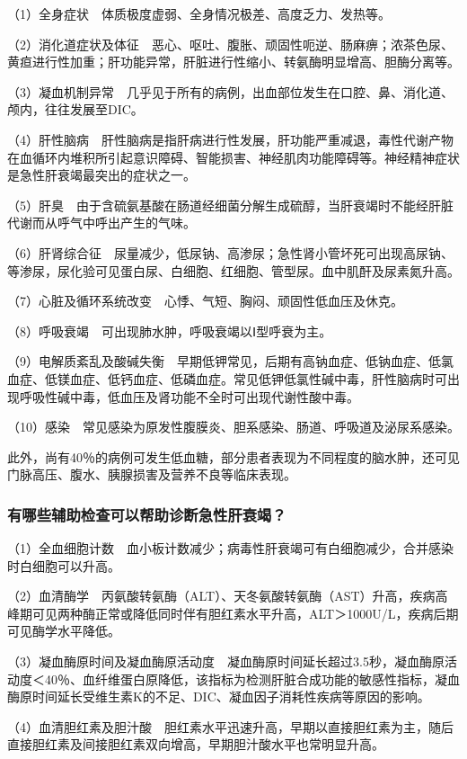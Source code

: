（1）全身症状　体质极度虚弱、全身情况极差、高度乏力、发热等。

（2）消化道症状及体征　恶心、呕吐、腹胀、顽固性呃逆、肠麻痹；浓茶色尿、黄疸进行性加重；肝功能异常，肝脏进行性缩小、转氨酶明显增高、胆酶分离等。

（3）凝血机制异常　几乎见于所有的病例，出血部位发生在口腔、鼻、消化道、颅内，往往发展至DIC。

（4）肝性脑病　肝性脑病是指肝病进行性发展，肝功能严重减退，毒性代谢产物在血循环内堆积所引起意识障碍、智能损害、神经肌肉功能障碍等。神经精神症状是急性肝衰竭最突出的症状之一。

（5）肝臭　由于含硫氨基酸在肠道经细菌分解生成硫醇，当肝衰竭时不能经肝脏代谢而从呼气中呼出产生的气味。

（6）肝肾综合征　尿量减少，低尿钠、高渗尿；急性肾小管坏死可出现高尿钠、等渗尿，尿化验可见蛋白尿、白细胞、红细胞、管型尿。血中肌酐及尿素氮升高。

（7）心脏及循环系统改变　心悸、气短、胸闷、顽固性低血压及休克。

（8）呼吸衰竭　可出现肺水肿，呼吸衰竭以Ⅰ型呼衰为主。

（9）电解质紊乱及酸碱失衡　早期低钾常见，后期有高钠血症、低钠血症、低氯血症、低镁血症、低钙血症、低磷血症。常见低钾低氯性碱中毒，肝性脑病时可出现呼吸性碱中毒，低血压及肾功能不全时可出现代谢性酸中毒。

（10）感染　常见感染为原发性腹膜炎、胆系感染、肠道、呼吸道及泌尿系感染。

此外，尚有40％的病例可发生低血糖，部分患者表现为不同程度的脑水肿，还可见门脉高压、腹水、胰腺损害及营养不良等临床表现。

\subsubsection{有哪些辅助检查可以帮助诊断急性肝衰竭？}

（1）全血细胞计数　血小板计数减少；病毒性肝衰竭可有白细胞减少，合并感染时白细胞可以升高。

（2）血清酶学　丙氨酸转氨酶（ALT）、天冬氨酸转氨酶（AST）升高，疾病高峰期可见两种酶正常或降低同时伴有胆红素水平升高，ALT＞1000U/L，疾病后期可见酶学水平降低。

（3）凝血酶原时间及凝血酶原活动度　凝血酶原时间延长超过3.5秒，凝血酶原活动度＜40％、血纤维蛋白原降低，该指标为检测肝脏合成功能的敏感性指标，凝血酶原时间延长受维生素K的不足、DIC、凝血因子消耗性疾病等原因的影响。

（4）血清胆红素及胆汁酸　胆红素水平迅速升高，早期以直接胆红素为主，随后直接胆红素及间接胆红素双向增高，早期胆汁酸水平也常明显升高。

